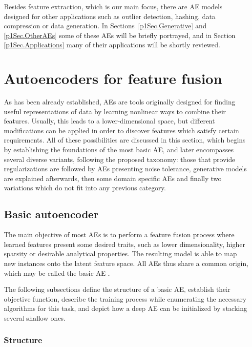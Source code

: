 Besides feature extraction, which is our main focus, there are AE models designed for other applications such as outlier detection, hashing, data compression or data generation. In Sections~\ref{p1Sec.Generative} and \ref{p1Sec.OtherAEs} some of these AEs will be briefly portrayed, and in Section \ref{p1Sec.Applications} many of their applications will be shortly reviewed. 


\section{Autoencoders for feature fusion}\label{p1Sect.AEforFF}

As has been already established, AEs are tools originally designed for finding useful representations of data by learning nonlinear ways to combine their features. Usually, this leads to a lower-dimensional space, but different modifications can be applied in order to discover features which satisfy certain requirements. All of these possibilities are discussed in this section, which begins by establishing the foundations of the most basic AE, and later encompasses several diverse variants, following the proposed taxonomy: those that provide regularizations are followed by AEs presenting noise tolerance, generative models are explained afterwards, then some domain specific AEs and finally two variations which do not fit into any previous category.

\subsection{Basic autoencoder}\label{p1Sec.BasicAE}

The main objective of most AEs is to perform a feature fusion process where learned features present some desired traits, such as lower dimensionality, higher sparsity or desirable analytical properties. The resulting model is able to map new instances onto the latent feature space. All AEs thus share a common origin, which may be called the basic AE .

The following subsections define the structure of a basic AE, establish their objective function, describe the training process while enumerating the necessary algorithms for this task, and depict how a deep AE can be initialized by stacking several shallow ones.


\subsubsection{Structure}

